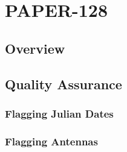 \chapter{PAPER-128}
\label{c.PSA128}

\section{Overview}
\section{Quality Assurance}
\subsection{Flagging Julian Dates}
\subsection{Flagging Antennas}





